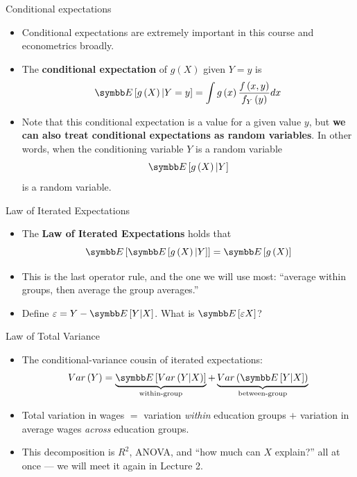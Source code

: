 \documentclass[aspectratio=169,11pt]{beamer}
\begin{document}
\begin{frame}{Conditional expectations}
\begin{itemize}
	\item Conditional expectations are extremely important in this course and econometrics broadly. 
	
	\medskip
	\item The {\bf conditional expectation} of $g\left(X\right)$ given $Y=y$ is\[
		\E\left[g\left( X\right) | Y=y\right] = \int g\left(x\right) \frac{f\left(x,y\right)}{f_{Y}\left(y\right)}dx
	\]
	
	\medskip
	\item Note that this conditional expectation is a value for a given value $y$, but {\bf we can also treat conditional
			expectations as random variables}. In other words, when the conditioning variable $Y$ is a random variable\[
			\E\left[g\left( X\right) | Y \right] 
			\]
			is a random variable.
			
\end{itemize}
\end{frame}





\begin{frame}{Law of Iterated Expectations}
\begin{itemize}
	\item The {\bf Law of Iterated Expectations} holds that\[
			\E\left[\E\left[g\left(X\right)|Y\right]\right] = \E\left[g\left(X\right)\right]
	\]

	\medskip
	\item This is the last operator rule, and the one we will use most:
		``average within groups, then average the group averages.''

	\medskip
	\item Define $\varepsilon = Y - \E\left[Y|X\right]$. What is $\E\left[\varepsilon X\right]$?
\end{itemize}
\end{frame}


\begin{frame}{Law of Total Variance}
\begin{itemize}
	\item The conditional-variance cousin of iterated expectations:\[
		Var\left(Y\right) = \underbrace{\E\left[Var\left(Y|X\right)\right]}_{\text{within-group}}
		 + \underbrace{Var\left(\E\left[Y|X\right]\right)}_{\text{between-group}}
	\]

	\medskip
	\item Total variation in wages $=$ variation \emph{within} education groups $+$
		variation in average wages \emph{across} education groups.

	\medskip
	\item This decomposition is $R^2$, ANOVA, and ``how much can $X$ explain?'' all at once
		--- we will meet it again in Lecture 2.
\end{itemize}
\end{frame}
\end{document}
